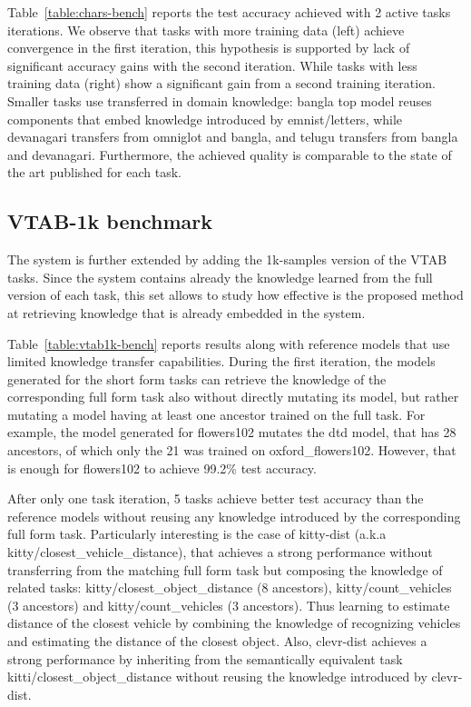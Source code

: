 \documentclass{article} \usepackage{iclr2023_conference,times}
\begin{document}
\begin{table}[b]
\begin{tabular}{lccccccccccccccccccc}
\\
\bottomrule
  \end{tabular}
    \vspace{-10pt}
\end{table}


Table~\ref{table:chars-bench} reports the test accuracy achieved with 2 active tasks iterations.
We observe that tasks with more training data (left) achieve convergence in the first iteration, this hypothesis is supported by lack of significant accuracy gains with the second iteration.
While tasks with less training data (right) show a significant gain from a second training iteration.
Smaller tasks use transferred in domain knowledge: bangla top model reuses components that embed knowledge introduced by emnist/letters, while devanagari transfers from omniglot and bangla, and telugu transfers from bangla and devanagari.
Furthermore, the achieved quality is comparable to the state of the art published for each task.


\subsection{VTAB-1k benchmark}
The system is further extended by adding the 1k-samples version of the VTAB tasks.
Since the system  contains already the knowledge learned from the full version of each task, this set allows to study how effective is the proposed method at retrieving knowledge that is already embedded in the system.

Table~\ref{table:vtab1k-bench} reports results along with reference models that use limited knowledge transfer capabilities.
During the first iteration, the models generated for the short form tasks can retrieve the knowledge of the corresponding full form task also without directly mutating its model,
but rather mutating a model having at least one 
ancestor trained on the full task.
For example, the model generated for flowers102 mutates the dtd model,
that has 28 ancestors, of which only the 21 was trained on oxford\_flowers102.
However, that is enough for flowers102 to achieve 99.2\% test 
accuracy.

After only one task iteration, 5 tasks achieve better test accuracy than the reference models without reusing any knowledge introduced by the corresponding full form task.
Particularly interesting is the case of kitty-dist (a.k.a kitty/closest\_vehicle\_distance), that achieves a strong performance without transferring from the matching full form task but composing the knowledge of related tasks: kitty/closest\_object\_distance (8 ancestors), kitty/count\_vehicles (3 ancestors) and kitty/count\_vehicles (3 ancestors).  Thus learning to estimate 
distance of the closest vehicle
by combining the knowledge of recognizing vehicles and estimating the distance of the closest object.
Also, clevr-dist achieves a strong performance by inheriting from the semantically equivalent task kitti/closest\_object\_distance without reusing the knowledge introduced by clevr-dist.
\end{document}

